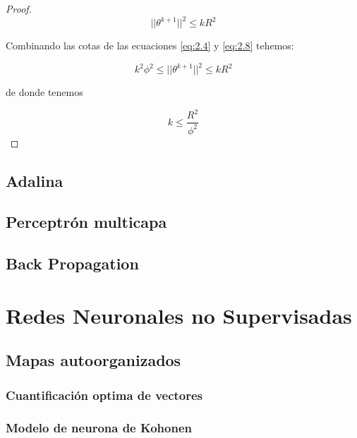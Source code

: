 \begin{proof}
\begin{equation}
  \label{eq:2.8}
  ||\theta^{k+1}||^2 \leq kR^2
\end{equation}

Combinando las cotas de las ecuaciones \ref{eq:2.4} y \ref{eq:2.8}
tehemos:

\begin{equation}
  k^2\phi^2 \leq ||\theta^{k+1}||^2 \leq kR^2
\end{equation}

de donde tenemos

\begin{equation*}
  k \leq \frac{R^2}{\phi^2}
\end{equation*}

\end{proof}



\subsection{Adalina}


\subsection{Perceptrón multicapa}


\subsection{Back Propagation}


\section{Redes Neuronales no Supervisadas}


\subsection{Mapas autoorganizados}


\subsubsection{Cuantificación optima de vectores}



\subsubsection{Modelo de neurona de Kohonen}


